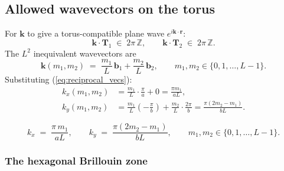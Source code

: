 \documentclass[11pt,a4paper]{article}
\newcommand{\nn}{\nonumber \\}
\newcommand{\vk}{\mathbf{k}}
\newcommand{\vr}{\mathbf{r}}
\newcommand{\vb}[1]{\mathbf{b}_{#1}}
\newcommand{\vT}[1]{\mathbf{T}_{#1}}
\begin{document}
\subsection{Allowed wavevectors on the torus}\label{ssec:k-allowed}

For $\vk$ to give a torus-compatible plane wave $e^{i \vk \cdot \vr}$:
\begin{equation}\label{eq:torus_compatible}
\vk \cdot \vT{1} \;\in\; 2\pi\, \mathbb{Z}, \qquad
\vk \cdot \vT{2} \;\in\; 2\pi\, \mathbb{Z}.
\end{equation}
The $L^2$ inequivalent wavevectors are
\begin{equation}\label{eq:k_lattice}
\vk(m_1, m_2) \;=\; \frac{m_1}{L}\,\vb{1} + \frac{m_2}{L}\,\vb{2},
\qquad m_1, m_2 \in \{0, 1, \ldots, L-1\}.
\end{equation}
Substituting (\ref{eq:reciprocal_vecs}):
\begin{align}\label{eq:k_components}
k_x(m_1, m_2) &= \tfrac{m_1}{L}\cdot\tfrac{\pi}{a} + 0 = \tfrac{\pi m_1}{a L}, \nn
k_y(m_1, m_2) &= \tfrac{m_1}{L}(-\tfrac{\pi}{b}) + \tfrac{m_2}{L}\cdot\tfrac{2\pi}{b} = \tfrac{\pi(2 m_2 - m_1)}{b L}.
\end{align}

\begin{correctbox}
\begin{equation}\label{eq:k_shear}
k_x \;=\; \frac{\pi\, m_1}{a L}, \qquad
k_y \;=\; \frac{\pi(2 m_2 - m_1)}{b L},
\qquad m_1, m_2 \in \{0, 1, \ldots, L-1\}.
\end{equation}
\end{correctbox}

\subsubsection{The hexagonal Brillouin zone}\label{ssec:bz}
\end{document}
